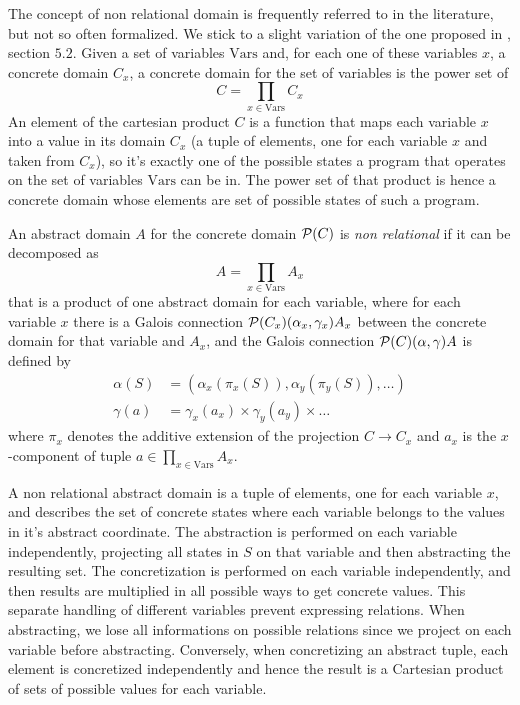 The concept of non relational domain is frequently referred to in the literature, but not so often formalized. We stick to a slight variation of the one proposed in \cite{giacobazzi-analyzing-analyses}, section $5.2$.
Given a set of variables $\text{Vars}$ and, for each one of these variables $x$, a concrete domain $C_x$, a concrete domain for the set of variables is the power set of
\[
C = \prod\limits_{x \in \text{Vars}} C_x
\]
An element of the cartesian product $C$ is a function that maps each variable $x$ into a value in its domain $C_x$ (a tuple of elements, one for each variable $x$ and taken from $C_x$), so it's exactly one of the possible states a program that operates on the set of variables $\text{Vars}$ can be in. The power set of that product is hence a concrete domain whose elements are set of possible states of such a program.

\begin{definition}
	An abstract domain $A$ for the concrete domain $\mathcal{P}(C)$ is \textit{non relational} if it can be decomposed as
	\[
	A = \prod\limits_{x \in \text{Vars}} A_x
	\]
	that is a product of one abstract domain for each variable, where for each variable $x$ there is a Galois connection $\mathcal{P}(C_x) (\alpha_x, \gamma_x) A_x$ between the concrete domain for that variable and $A_x$, and the Galois connection $\mathcal{P}(C) (\alpha, \gamma) A$ is defined by
	\begin{align*}
		\alpha(S) &= (\alpha_x(\pi_x(S)), \alpha_y(\pi_y(S)), \dots) \\
		\gamma(a) &= \gamma_x(a_x) \times \gamma_y(a_y) \times \dots
	\end{align*}
	where $\pi_x$ denotes the additive extension of the projection $C \rightarrow C_x$ and $a_x$ is the $x$-component of tuple $a \in \prod\limits_{x \in \text{Vars}} A_x$.
\end{definition}

A non relational abstract domain is a tuple of elements, one for each variable $x$, and describes the set of concrete states where each variable belongs to the values in it's abstract coordinate. The abstraction is performed on each variable independently, projecting all states in $S$ on that variable and then abstracting the resulting set. The concretization is performed on each variable independently, and then results are multiplied in all possible ways to get concrete values.
This separate handling of different variables prevent expressing relations. When abstracting, we lose all informations on possible relations since we project on each variable before abstracting. Conversely, when concretizing an abstract tuple, each element is concretized independently and hence the result is a Cartesian product of sets of possible values for each variable.

